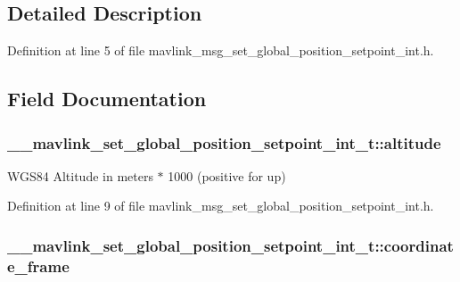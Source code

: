 \subsection{Detailed Description}


Definition at line 5 of file mavlink\-\_\-msg\-\_\-set\-\_\-global\-\_\-position\-\_\-setpoint\-\_\-int.\-h.



\subsection{Field Documentation}
\hypertarget{struct____mavlink__set__global__position__setpoint__int__t_a5b6969b11abbf7cb228976942d8417b9}{
\subsubsection[{altitude}]{ \-\_\-\-\_\-mavlink\-\_\-set\-\_\-global\-\_\-position\-\_\-setpoint\-\_\-int\-\_\-t\-::altitude}}\label{struct____mavlink__set__global__position__setpoint__int__t_a5b6969b11abbf7cb228976942d8417b9}


W\-G\-S84 Altitude in meters $\ast$ 1000 (positive for up) 



Definition at line 9 of file mavlink\-\_\-msg\-\_\-set\-\_\-global\-\_\-position\-\_\-setpoint\-\_\-int.\-h.

\hypertarget{struct____mavlink__set__global__position__setpoint__int__t_a305c83285aa51ece52abfdf4e395b248}{
\subsubsection[{coordinate\-\_\-frame}]{ \-\_\-\-\_\-mavlink\-\_\-set\-\_\-global\-\_\-position\-\_\-setpoint\-\_\-int\-\_\-t\-::coordinate\-\_\-frame}}\label{struct____mavlink__set__global__position__setpoint__int__t_a305c83285aa51ece52abfdf4e395b248}


